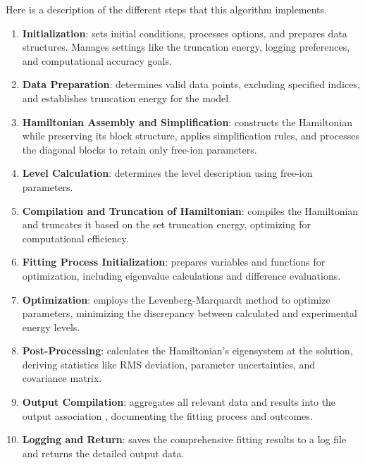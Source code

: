 \documentclass[11pt, twoside,openright]{article}
\begin{document}
Here is a description of the different steps that this algorithm implements.
\begin{enumerate}
  \item \textbf{Initialization}: sets initial conditions, processes options, and prepares data structures. Manages settings like the truncation energy, logging preferences, and computational accuracy goals.
  
  \item \textbf{Data Preparation}: determines valid data points, excluding specified indices, and establishes truncation energy for the model.
  
  \item \textbf{Hamiltonian Assembly and Simplification}: constructs the Hamiltonian while preserving its block structure, applies simplification rules, and processes the diagonal blocks to retain only free-ion parameters.
  
  \item \textbf{Level Calculation}: determines the level description using free-ion parameters.
  
  \item \textbf{Compilation and Truncation of Hamiltonian}: compiles the Hamiltonian and truncates it based on the set truncation energy, optimizing for computational efficiency.
  
  \item \textbf{Fitting Process Initialization}: prepares variables and functions for optimization, including eigenvalue calculations and difference evaluations.
  
  \item \textbf{Optimization}: employs the Levenberg-Marquardt method to optimize parameters, minimizing the discrepancy between calculated and experimental energy levels.
  
  \item \textbf{Post-Processing}: calculates the Hamiltonian's eigensystem at the solution, deriving statistics like RMS deviation, parameter uncertainties, and covariance matrix.
  
  \item \textbf{Output Compilation}: aggregates all relevant data and results into the output association , documenting the fitting process and outcomes.
  
  \item \textbf{Logging and Return}: saves the comprehensive fitting results to a log file and returns the detailed output data.
\end{enumerate}
\end{document}
